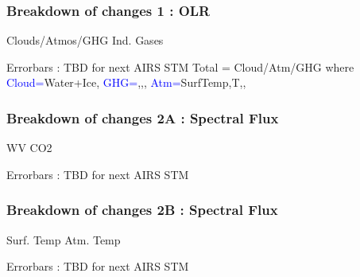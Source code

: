 \documentclass[10pt,t]{beamer}
\begin{document}
\begin{frame}
  \frametitle{Breakdown of changes 1 : OLR}
  \hspace{0.50in} Clouds/Atmos/GHG  \hspace{1.5in} Ind. Gases \\
  \begin{center}
  \end{center}
 Errorbars : TBD for next AIRS STM \newline
 Total = Cloud/Atm/GHG where \newline
 \textcolor{blue}{Cloud=}Water+Ice, \textcolor{blue}{GHG=}\cd,\methane,\nitrous, \textcolor{blue}{Atm=}SurfTemp,T,\water,\ozone
\end{frame}

\begin{frame}
  \frametitle{Breakdown of changes 2A : Spectral Flux}
  \hspace{0.50in} WV  \hspace{1.5in} CO2 \\
  \begin{center}
  \end{center}
 Errorbars : TBD for next AIRS STM
\end{frame}

\begin{frame}
  \frametitle{Breakdown of changes 2B : Spectral Flux}
  \hspace{0.50in} Surf. Temp  \hspace{1.5in} Atm. Temp \\
  \begin{center}
  \end{center}
 Errorbars : TBD for next AIRS STM
\end{frame}
\end{document}
